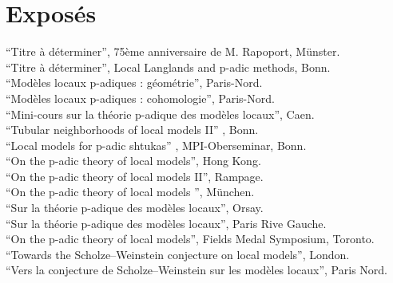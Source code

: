 \documentclass[12pt]{article} %
\begin{document}


\section*{Exposés}
``Titre à déterminer'',  75ème anniversaire de M. Rapoport, Münster.\\

``Titre à déterminer'',  Local Langlands and p-adic methods, Bonn.\\

``Modèles locaux p-adiques : géométrie'',  Paris-Nord.\\

``Modèles locaux p-adiques : cohomologie'',  Paris-Nord.\\

``Mini-cours sur la théorie p-adique des modèles locaux'', Caen.
\\

``Tubular neighborhoods of local models II'' , Bonn.\\

``Local models for p-adic shtukas'' , MPI-Oberseminar, Bonn.\\

``On the p-adic  theory of local models'', Hong Kong.
\\

``On the p-adic  theory of local models II'', Rampage.
\\

``On the p-adic  theory of local models '', München.
\\


``Sur la  théorie p-adique des modèles locaux'', Orsay.
\\

``Sur la  théorie p-adique des modèles locaux'', Paris Rive Gauche.
\\

 ``On the p-adic theory of local models'', Fields Medal Symposium, Toronto.
\\

``Towards the Scholze--Weinstein conjecture on local models'', London.
\\

 ``Vers la conjecture de Scholze--Weinstein sur les modèles locaux'', Paris Nord.
\\
\end{document}

